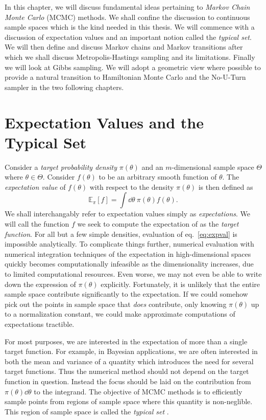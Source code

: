 In this chapter, we will discuss fundamental ideas pertaining to \textit{Markov Chain Monte Carlo} (MCMC) methods.
We shall confine the discussion to continuous sample spaces which is the kind needed in this thesis.
We will commence with a discussion of expectation values and an important notion called the \textit{typical set}. 
We will then define and discuss Markov chains and Markov transitions after which we shall
discuss Metropolis-Hastings sampling and its limitations. Finally we will
look at Gibbs sampling.
We will adopt a geometric view where possible to provide a natural transition to Hamiltonian Monte Carlo and the No-U-Turn sampler
in the two following chapters. 

\section{Expectation Values and the Typical Set}
Consider a \textit{target probability density} $\pi(\theta)$ and an $m$-dimensional sample space $\Theta$ where $\theta \in \Theta$. 
Consider $f(\theta)$ to be an arbitrary smooth
function of $\theta$. The \textit{expectation value} of $f(\theta)$ with respect to the density $\pi(\theta)$ is then defined as
\begin{equation}\label{eq:expval}
    \mathbb{E}_\pi[f] = \int \dd \theta \ \pi(\theta)f(\theta).
\end{equation}
We shall interchangably refer to expectation values simply as \textit{expectations}.
We will call the function $f$ we seek to compute the expectation of as the \textit{target function}.
For all but a few simple densities, evaluation of eq.~\eqref{eq:expval} is impossible analytically. 
To complicate things further, numerical evaluation with numerical integration techniques of the expectation in high-dimensional spaces quickly becomes computationally
infeasible as the dimensionality increases, due to limited computational resources. 
Even worse, we may not even be able to write down the expression of $\pi(\theta)$ explicitly.
Fortunately, it is unlikely that the entire sample space contribute significantly to the expectation.
If we could somehow pick out the points in sample space that \textit{does} contribute, only knowing $\pi(\theta)$ up to a normalization constant, we could
make approximate computations of expectations tractible. 

For most purposes, we are interested in the expectation of more than a single target function. For example, in Bayesian applications,
we are often interested in both the mean and variance of a quantity which introduces the need for several target functions. 
Thus the numerical method should not depend on the target function in question. 
Instead the focus should be laid on the contribution from $\pi(\theta)\dd \theta$ to
the integrand. The objective of MCMC methods is to efficiently 
sample points from regions of sample space where this quantity is non-neglible. This region of sample space
is called the \textit{typical set} \cite{conceptual_intro_hmc}. 

